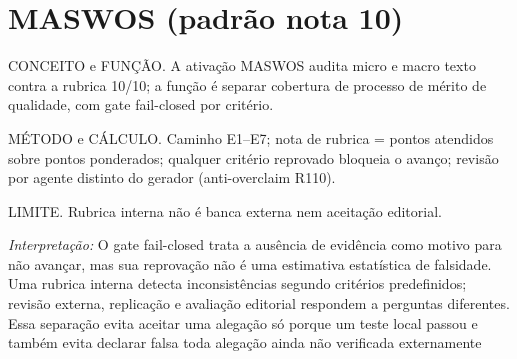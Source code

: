 \section{MASWOS (padrão nota 10)}
\begin{descricao}
CONCEITO e FUNÇÃO. A ativação MASWOS audita micro e macro texto contra a
rubrica 10/10; a função é separar cobertura de processo de mérito de qualidade,
com gate fail-closed por critério.
\end{descricao}
\begin{metodo}
MÉTODO e CÁLCULO. Caminho E1--E7; nota de rubrica = pontos atendidos sobre
pontos ponderados; qualquer critério reprovado bloqueia o avanço; revisão
por agente distinto do gerador (anti-overclaim R110).
\end{metodo}
\begin{aviso}
LIMITE. Rubrica interna não é banca externa nem aceitação editorial.
\end{aviso}
\noindent\textit{Interpretação:} O gate fail-closed trata a ausência de evidência como motivo para não avançar, mas sua reprovação não é uma estimativa estatística de falsidade. Uma rubrica interna detecta inconsistências segundo critérios predefinidos; revisão externa, replicação e avaliação editorial respondem a perguntas diferentes. Essa separação evita aceitar uma alegação só porque um teste local passou e também evita declarar falsa toda alegação ainda não verificada externamente  %
